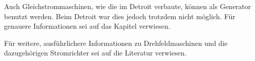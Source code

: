 Auch Gleichstrommaschinen, wie die im Detroit verbaute, können als Generator benutzt werden. Beim Detroit war dies jedoch trotzdem nicht möglich. Für genauere Informationen sei auf das Kapitel  verwiesen.

Für weitere, ausführlichere Informationen zu Drehfeldmaschinen und die dazugehörigen Stromrichter sei auf die Literatur verwiesen. 

\newpage